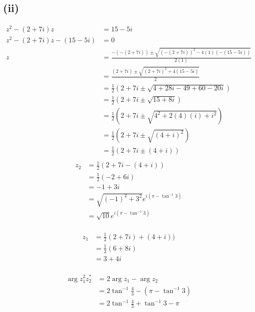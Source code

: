 \documentclass[12pt,a4paper]{article}
\begin{document}
\subsection*{(ii)}
\[\begin{aligned}
    z^2-(2+7i)z&=15-5i\\
    z^2-(2+7i)z-(15-5i)&=0\\
    z&=\frac{-(-(2+7i))\pm\sqrt{(-(2+7i))^2-4(1)(-(15-5i))}}{2(1)}\\
    &=\frac{(2+7i)\pm\sqrt{(2+7i)^2+4(15-5i)}}{2}\\
    &=\frac12\left(2+7i\pm\sqrt{4+28i-49+60-20i}\right)\\
    &=\frac12\left(2+7i\pm\sqrt{15+8i}\right)\\
    &=\frac12\left(2+7i\pm\sqrt{4^2+2(4)(i)+i^2}\right)\\
    &=\frac12\left(2+7i\pm\sqrt{(4+i)^2}\right)\\
    &=\frac12(2+7i\pm(4+i))\\
\end{aligned}\]
\[\begin{aligned}
    z_2&=\frac12(2+7i-(4+i))\\
    &=\frac12(-2+6i)\\
    &=-1+3i\\
    &=\sqrt{(-1)^2+3^2}e^{i\left(\pi-\tan^{-1}3\right)}\\
    &=\boxed{\sqrt{10}e^{i\left(\pi-\tan^{-1}3\right)}}
\end{aligned}\]
\\
\[\begin{aligned}
    z_1&=\frac12(2+7i)+(4+i))\\
    &=\frac12(6+8i)\\
    &=3+4i
\end{aligned}\]
\\
\[\begin{aligned}
    \arg z_1^2z_2^*&=2\arg z_1-\arg z_2\\
    &=2\tan^{-1}\frac43-\left(\pi-\tan^{-1}3\right)\\
    &=\boxed{2\tan^{-1}\frac43+\tan^{-1}3-\pi}
\end{aligned}\]
\end{document}
